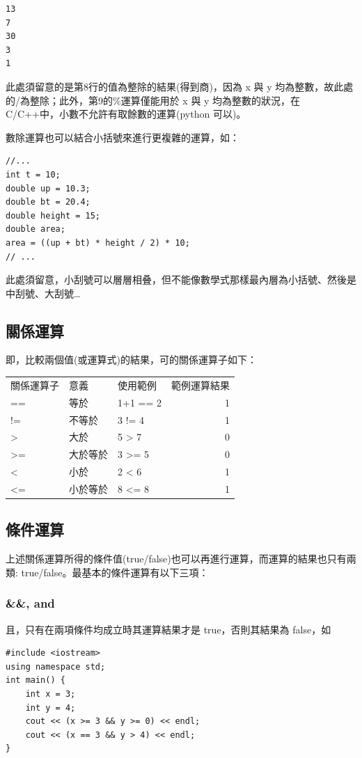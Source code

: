 \documentclass[12pt,a4paper]{article}
\begin{document}
\begin{verbatim}
13
7
30
3
1
\end{verbatim}


此處須留意的是第8行的值為整除的結果(得到商)，因為 x 與 y 均為整數，故此處的/為整除；此外，第9的\%運算僅能用於 x 與 y 均為整數的狀況，在 C/C++中，小數不允許有取餘數的運算(python 可以)。

數除運算也可以結合小括號來進行更複雜的運算，如：
\lstset{breaklines=true,language=cpp,label= ,caption= ,captionpos=b,firstnumber=1,numbers=left}
\begin{lstlisting}
//...
int t = 10;
double up = 10.3;
double bt = 20.4;
double height = 15;
double area;
area = ((up + bt) * height / 2) * 10;
// ...
\end{lstlisting}

此處須留意，小刮號可以層層相叠，但不能像數學式那樣最內層為小括號、然後是中刮號、大刮號\ldots{}

\subsection{關係運算}
\label{cpp_cond_operation}
即，比較兩個值(或運算式)的結果，可的關係運算子如下：
\begin{center}
\begin{tabular}{lllr}
關係運算子 & 意義 & 使用範例 & 範例運算結果\\
== & 等於 & 1+1 == 2 & 1\\
!= & 不等於 & 3 != 4 & 1\\
> & 大於 & 5 > 7 & 0\\
>= & 大於等於 & 3 >= 5 & 0\\
< & 小於 & 2 < 6 & 1\\
<= & 小於等於 & 8 <= 8 & 1\\
\end{tabular}
\end{center}

\subsection{條件運算}
\label{sec:orgd21a317}
上述關係運算所得的條件值(true/false)也可以再進行運算，而運算的結果也只有兩類: true/false。最基本的條件運算有以下三項：
\subsubsection{\&\&, and}
\label{sec:org4405b6d}
且，只有在兩項條件均成立時其運算結果才是 true，否則其結果為 false，如
\lstset{breaklines=true,language=cpp,label= ,caption= ,captionpos=b,firstnumber=1,numbers=left}
\begin{lstlisting}
#include <iostream>
using namespace std;
int main() {
    int x = 3;
    int y = 4;
    cout << (x >= 3 && y >= 0) << endl;
    cout << (x == 3 && y > 4) << endl;
}
\end{lstlisting}
\end{document}
